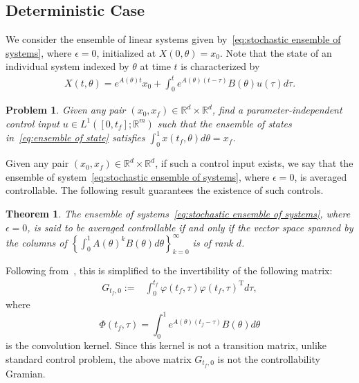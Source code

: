 \documentclass[12pt]{amsart}
\newtheorem{theorem}{Theorem}[section]
\newtheorem{problem}{Problem}[section]
\newcommand{\R}{\mathbb{R}}
\renewcommand{\(}{\left (}
\renewcommand{\)}{\right )}
\numberwithin{equation}{section}
\begin{document}
\subsection{Deterministic Case}
We consider the ensemble of linear systems given by~\eqref{eq:stochastic ensemble of systems}, where $\epsilon=0$, initialized at $X(0,\theta)=x_0$.
Note that the state of an individual system indexed by $\theta$ at time $t$ is characterized by 
\begin{align}\label{eq:ensemble of state}
X(t,\theta)=e^{A(\theta)t} x_0+\int_{0}^{t}e^{A(\theta)(t-\tau)}B(\theta)u(\tau)d\tau.
\end{align}

\begin{problem}\label{prob: 1}
Given any pair $(x_0,x_f)\in\R^d\times\R^d$, find a parameter-independent control input $u\in L^1([0,t_f];\mathbb{R}^m)$ such that the ensemble of states in~\eqref{eq:ensemble of state} satisfies $\int_{0}^{1} x(t_f,\theta)d\theta=x_f$.  
\end{problem}

Given any pair $(x_0,x_f)\in\R^d\times\R^d$, if such a control input exists, we say that the ensemble of system~\eqref{eq:stochastic ensemble of systems}, where $\epsilon=0$, is averaged controllable. The following result guarantees the existence of such controls. 
\begin{theorem}\cite[Theorem~1]{ZE:14}\label{thm:rank condition}
The ensemble of systems~\eqref{eq:stochastic ensemble of systems}, where $\epsilon=0$, is said to be averaged controllable  if and only if the vector space spanned by the columns of $\left\{\int_{0}^{1}A(\theta)^kB(\theta)d\theta \right\}_{k= 0}^{\infty}$ is of rank $d$.
\end{theorem}
Following from~\cite{ADO:22}, this is simplified to the invertibility of the following matrix:
\begin{align}\label{eq: Gramian}
G_{t_f,0}:=&\int_{0}^{t_f}\varphi(t_f,\tau)\varphi(t_f,\tau)^{\mathrm{T}}d\tau,
\end{align}
where
\begin{equation}\label{eq: convolution function}
\Phi(t_f,\tau)=\int_{0}^{1}e^{A(\theta)(t_f-\tau)}B(\theta)d\theta    
\end{equation}
is the convolution kernel. Since this kernel is not a transition matrix, unlike standard control problem, the above matrix $G_{t_f,0}$ is not the controllability Gramian.
\end{document}
